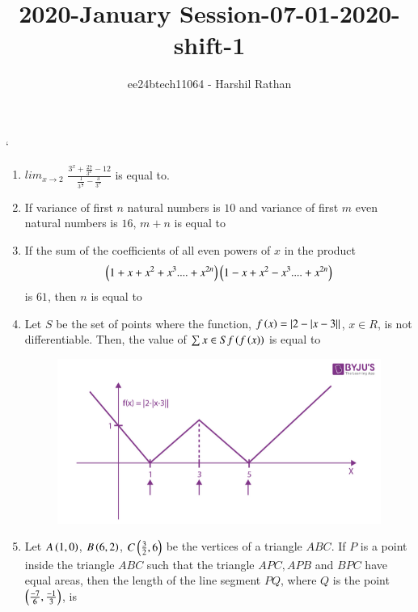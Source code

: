 \documentclass[journal,12pt,twocolumn]{IEEEtran}
\theoremstyle{remark}
\begin{document}

\vspace{3cm}

\title{2020-January Session-07-01-2020-shift-1}
\author{ee24btech11064 - Harshil Rathan}
\maketitle
\newpage
\bigskip

\renewcommand{\thefigure}{\theenumi}
`\renewcommand{\thetable}{\theenumi}
\begin{enumerate}
\item $lim_{x \rightarrow 2}$ $\frac{3^x+\frac{27}{3^x}-12}{\frac{1}{3^\frac{x}{2}}-\frac{3}{3^x}}$ is equal to.\\
\item If variance of first $n$ natural numbers is $10$ and variance of first $m$ even natural numbers is $16$, $m + n$ is equal to\\
\item  If the sum of the coefficients of all even powers of $x$ in the product
\begin{align*}
    \left(1+x+x^2+x^3... . +x^{2n}\right)\left(1-x+x^2-x^3... . +x^{2n}\right)
\end{align*}
is $61$, then $n$ is equal to \\
\item Let $S$ be the set of points where the function, $f\left(x\right)=|2-|x-3||$, $x \in R$, is not differentiable. Then, the value of $\sum x \in S f\left(f\left(x\right)\right)$ is equal to
\begin{figure}[h!]
   \centering
   \includegraphics[width=\linewidth]{q24.png}
   \caption{}
   \label{q24}
   \label{stemplot}
\end{figure}
\item Let $A\left(1,0\right)$, $B\left(6,2\right)$, $C\left(\frac{3}{2},6\right)$ be the vertices of a triangle $ABC$. If $P$ is a point inside the triangle $ABC$ such that the triangle $APC,APB$ and $BPC$ have equal areas, then the length of the line segment $PQ$, where $Q$ is the point $\left(\frac{-7}{6},\frac{-1}{3}\right)$, is 
\end{enumerate}
\end{document}
